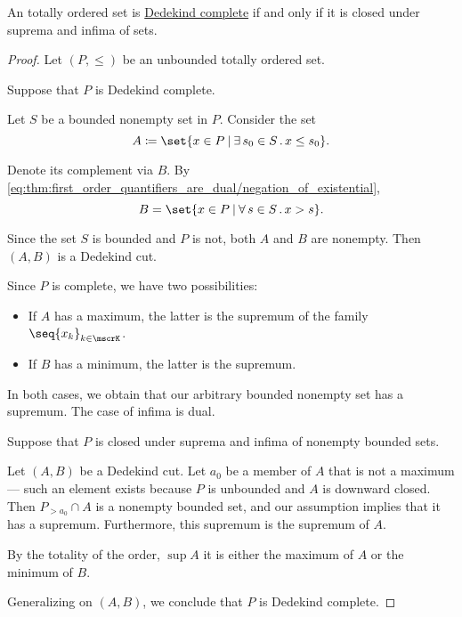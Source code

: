 \begin{proposition}\label{thm:dedekind_completeness_unbounded_characterization}
  An  totally ordered set is \hyperref[def:dedekind_completeness]{Dedekind complete} if and only if it is closed under suprema and infima of  sets.
\end{proposition}
\begin{proof}
  Let \( (P, \leq) \) be an unbounded totally ordered set.

  \SufficiencySubProof Suppose that \( P \) is Dedekind complete.

  Let \( S \) be a bounded nonempty set in \( P \). Consider the set
  \begin{equation*}
    A \coloneqq \set{ x \in P \given \qexists {s_0 \in S} x \leq s_0 }.
  \end{equation*}

  Denote its complement via \( B \). By \eqref{eq:thm:first_order_quantifiers_are_dual/negation_of_existential},
  \begin{equation*}
    B = \set{ x \in P \given \qforall {s \in S} x > s }.
  \end{equation*}

  Since the set \( S \) is bounded and \( P \) is not, both \( A \) and \( B \) are nonempty. Then \( (A, B) \) is a Dedekind cut.

  Since \( P \) is complete, we have two possibilities:
  \begin{itemize}
    \item If \( A \) has a maximum, the latter is the supremum of the family \( \seq{ x_k }_{k \in \mscrK} \).
    \item If \( B \) has a minimum, the latter is the supremum.
  \end{itemize}

  In both cases, we obtain that our arbitrary bounded nonempty set has a supremum. The case of infima is dual.

  \NecessitySubProof Suppose that \( P \) is closed under suprema and infima of nonempty bounded sets.

  Let \( (A, B) \) be a Dedekind cut. Let \( a_0 \) be a member of \( A \) that is not a maximum --- such an element exists because \( P \) is unbounded and \( A \) is downward closed. Then \( P_{>a_0} \cap A \) is a nonempty bounded set, and our assumption implies that it has a supremum. Furthermore, this supremum is the supremum of \( A \).

  By the totality of the order, \( \sup A \) it is either the maximum of \( A \) or the minimum of \( B \).

  Generalizing on \( (A, B) \), we conclude that \( P \) is Dedekind complete.
\end{proof}

